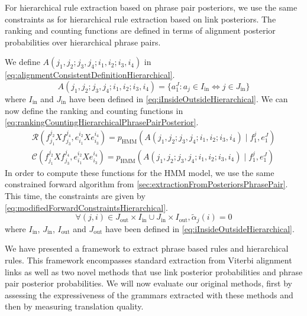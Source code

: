 For hierarchical rule extraction based on phrase pair posteriors, we use the
same constraints as for hierarchical rule extraction based on link posteriors.
The ranking and counting functions are defined in terms of alignment posterior
probabilities over hierarchical phrase pairs.

We define
$A(j_1, j_2; j_3, j_4; i_1, i_2; i_3, i_4)$ in
\autoref{eq:alignmentConsistentDefinitionHierarchical}.
%
\begin{equation}
  A(j_1, j_2; j_3, j_4; i_1, i_2; i_3, i_4) = \{a_1^J : a_j \in I_{\text{in}} \Leftrightarrow j \in J_{\text{in}} \}
  \label{eq:alignmentConsistentDefinitionHierarchical}
\end{equation}
%
where $I_{\text{in}}$ and $J_{\text{in}}$ have been defined
in \autoref{eq:iInsideOutsideHierarchical}.
We can now define the ranking and counting functions in
\autoref{eq:rankingCountingHierarchicalPhrasePairPosterior}.
%
\begin{equation}
  \begin{split}
  \mathcal{R}(f_{j_1}^{j_2} X f_{j_3}^{j_4}, e_{i_1}^{i_2} X e_{i_3}^{i_4}) = p_{\text{HMM}}(A(j_1, j_2; j_3, j_4; i_1, i_2; i_3, i_4) \mid f_1^j, e_1^J) \\
  \mathcal{C}(f_{j_1}^{j_2} X f_{j_3}^{j_4}, e_{i_1}^{i_2} X e_{i_3}^{i_4}) = p_{\text{HMM}}(A(j_1, j_2; j_3, j_4; i_1, i_2; i_3, i_4) \mid f_1^j, e_1^J)
  \end{split}
  \label{eq:rankingCountingHierarchicalPhrasePairPosterior}
\end{equation}
%
In order to compute these functions for the HMM model, we use the same
constrained forward algorithm from
\autoref{sec:extractionFromPosteriorsPhrasePair}. This time, the constraints
are given by \autoref{eq:modifiedForwardConstraintsHierarchical}.
%
\begin{equation}
  \forall (j, i) \in J_{\text{out}} \times I_{\text{in}} \cup J_{\text{in}} \times I_{\text{out}} , \tilde \alpha_j(i) = 0
  \label{eq:modifiedForwardConstraintsHierarchical}
\end{equation}
%
where $I_{\text{in}}$, $J_{\text{in}}$, $I_{\text{out}}$ and $J_{\text{out}}$
have been defined
in \autoref{eq:iInsideOutsideHierarchical}.

We have presented a framework to extract phrase based rules and hierarchical
rules. This framework encompasses standard extraction from Viterbi
alignment links as well as two novel methods that use link posterior
probabilities and phrase pair posterior probabilities.
We will now evaluate our original methods, first by assessing
the expressiveness of the grammars extracted with these methods
and then by measuring translation quality.

